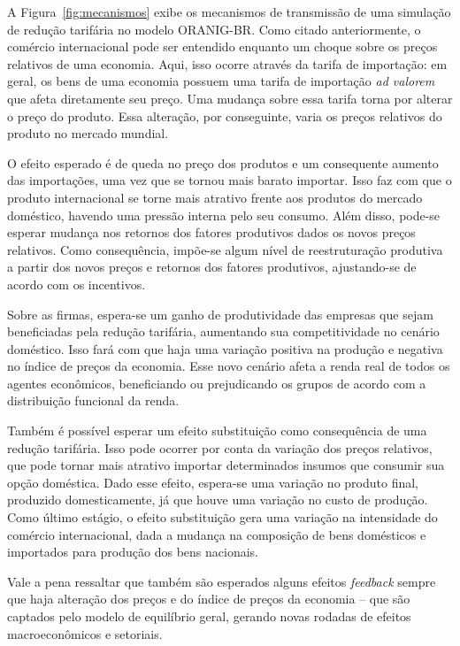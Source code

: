 A Figura~\ref{fig:mecanismos} exibe os mecanismos de transmissão de uma simulação de redução tarifária no modelo ORANIG-BR. Como citado anteriormente, o comércio internacional pode ser entendido enquanto um choque sobre os preços relativos de uma economia. Aqui, isso ocorre através da tarifa de importação: em geral, os bens de uma economia possuem uma tarifa de importação \textit{ad valorem} que afeta diretamente seu preço. Uma mudança sobre essa tarifa torna por alterar o preço do produto. Essa alteração, por conseguinte, varia os preços relativos do produto no mercado mundial.

O efeito esperado é de queda no preço dos produtos e um consequente aumento das importações, uma vez que se tornou mais barato importar. Isso faz com que o produto internacional se torne mais atrativo frente aos produtos do mercado doméstico, havendo uma pressão interna pelo seu consumo. Além disso, pode-se esperar mudança nos retornos dos fatores produtivos dados os novos preços relativos. Como consequência, impõe-se algum nível de reestruturação produtiva a partir dos novos preços e retornos dos fatores produtivos, ajustando-se de acordo com os incentivos.

Sobre as firmas, espera-se um ganho de produtividade das empresas que sejam beneficiadas pela redução tarifária, aumentando sua competitividade no cenário doméstico. Isso fará com que haja uma variação positiva na produção e negativa no índice de preços da economia. Esse novo cenário afeta a renda real de todos os agentes econômicos, beneficiando ou prejudicando os grupos de acordo com a distribuição funcional da renda.

Também é possível esperar um efeito substituição como consequência de uma redução tarifária. Isso pode ocorrer por conta da variação dos preços relativos, que pode tornar mais atrativo importar determinados insumos que consumir sua opção doméstica. Dado esse efeito, espera-se uma variação no produto final, produzido domesticamente, já que houve uma variação no custo de produção. Como último estágio, o efeito substituição gera uma variação na intensidade do comércio internacional, dada a mudança na composição de bens domésticos e importados para produção dos bens nacionais.

Vale a pena ressaltar que também são esperados alguns efeitos \textit{feedback} sempre que haja alteração dos preços e do índice de preços da economia -- que são captados pelo modelo de equilíbrio geral, gerando novas rodadas de efeitos macroeconômicos e setoriais.


